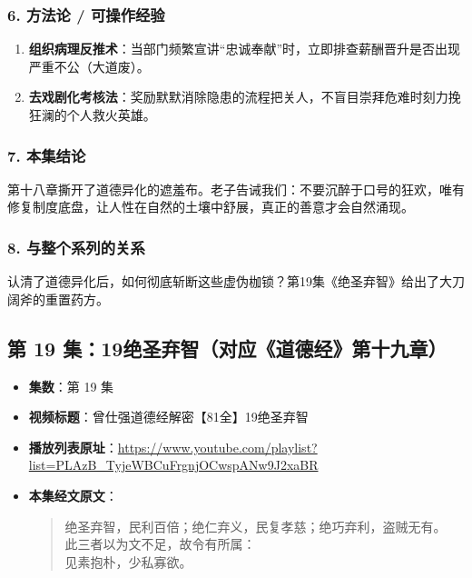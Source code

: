 \subsubsection{6. 方法论 / 可操作经验}
\begin{enumerate}
    \item \textbf{组织病理反推术}：当部门频繁宣讲“忠诚奉献”时，立即排查薪酬晋升是否出现严重不公（大道废）。
    \item \textbf{去戏剧化考核法}：奖励默默消除隐患的流程把关人，不盲目崇拜危难时刻力挽狂澜的个人救火英雄。
\end{enumerate}

\subsubsection{7. 本集结论}
第十八章撕开了道德异化的遮羞布。老子告诫我们：不要沉醉于口号的狂欢，唯有修复制度底盘，让人性在自然的土壤中舒展，真正的善意才会自然涌现。

\subsubsection{8. 与整个系列的关系}
认清了道德异化后，如何彻底斩断这些虚伪枷锁？第19集《绝圣弃智》给出了大刀阔斧的重置药方。

\clearpage

\subsection{第 19 集：19绝圣弃智（对应《道德经》第十九章）}
\label{sec:ep19}

\begin{itemize}
    \item \textbf{集数}：第 19 集
    \item \textbf{视频标题}：曾仕强道德经解密【81全】19绝圣弃智
    \item \textbf{播放列表原址}：\url{https://www.youtube.com/playlist?list=PLAzB_TyjeWBCuFrgnjOCwspANw9J2xaBR}
    \item \textbf{本集经文原文}：
    \begin{quote}\kaishu
    绝圣弃智，民利百倍；绝仁弃义，民复孝慈；绝巧弃利，盗贼无有。\\
    此三者以为文不足，故令有所属：\\
    见素抱朴，少私寡欲。
    \end{quote}
\end{itemize}

